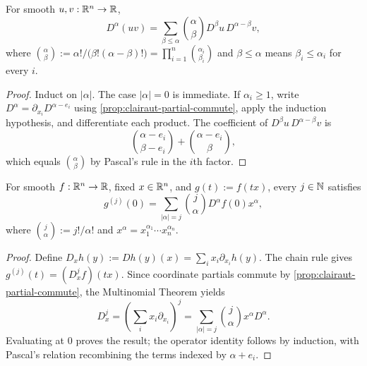 \begin{proposition}
\label{prop:leibniz-formula}





For smooth $u,v : \mathbb{R}^n \to \mathbb{R}$,
\[
D^\alpha(uv)=\sum_{\beta\leq\alpha}\binom{\alpha}{\beta}
D^\beta u\,D^{\alpha-\beta}v,
\]
where
$\binom{\alpha}{\beta}:=\alpha!/\bigl(\beta!(\alpha-\beta)!\bigr)
=\prod_{i=1}^n\binom{\alpha_i}{\beta_i}$ and
$\beta\leq\alpha$ means $\beta_i\leq\alpha_i$ for every $i$.
\end{proposition}
\begin{proof}

\sketch
Induct on $|\alpha|$. The case $|\alpha|=0$ is immediate. If
$\alpha_i\geq1$, write $D^\alpha=\partial_{x_i}D^{\alpha-e_i}$ using
\cref{prop:clairaut-partial-commute}, apply the induction hypothesis, and
differentiate each product. The coefficient of
$D^\beta u\,D^{\alpha-\beta}v$ is
\[
\binom{\alpha-e_i}{\beta-e_i}+\binom{\alpha-e_i}{\beta},
\]
which equals $\binom{\alpha}{\beta}$ by Pascal's rule in the $i$th factor.
\end{proof}

\begin{proposition}
\label{prop:directional-derivative-multinomial}





For smooth $f : \mathbb{R}^n \to \mathbb{R}$, fixed $x\in\mathbb{R}^n$, and
$g(t):=f(tx)$, every $j\in\mathbb{N}$ satisfies
\[
g^{(j)}(0)=\sum_{|\alpha|=j}\binom{j}{\alpha}D^\alpha f(0)x^\alpha,
\]
where $\binom{j}{\alpha}:=j!/\alpha!$ and
$x^\alpha=x_1^{\alpha_1}\cdots x_n^{\alpha_n}$.
\end{proposition}
\begin{proof}

\sketch
Define $D_xh(y):=Dh(y)(x)=\sum_i x_i\partial_{x_i}h(y)$. The chain rule
gives $g^{(j)}(t)=(D_x^j f)(tx)$. Since coordinate partials commute by
\cref{prop:clairaut-partial-commute}, the Multinomial Theorem yields
\[
D_x^j=\left(\sum_i x_i\partial_{x_i}\right)^j
=\sum_{|\alpha|=j}\binom{j}{\alpha}x^\alpha D^\alpha.
\]
Evaluating at $0$ proves the result; the operator identity follows by
induction, with Pascal's relation recombining the terms indexed by
$\alpha+e_i$.
\end{proof}


